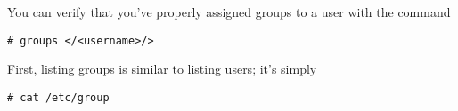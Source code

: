 \documentclass[12pt,letterpaper]{article}
\begin{document}
\begin{enumerate}
You can verify that you've properly assigned groups to a user with the command
\begin{lstlisting}
# groups </<username>/>
\end{lstlisting}


First, listing groups is similar to listing users; it's simply
\begin{lstlisting}
# cat /etc/group
\end{lstlisting}



\end{enumerate}
\end{document}
